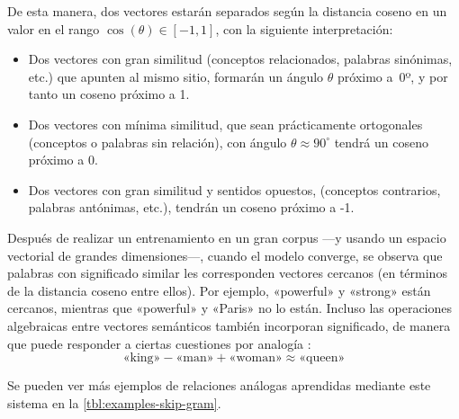De esta manera, dos vectores estarán separados según la distancia coseno en un valor en el rango $\cos(\theta) \in [-1,1]$, con la siguiente interpretación:
\begin{itemize}
\item Dos vectores con gran similitud (conceptos relacionados, palabras sinónimas, etc.) que apunten al mismo sitio, formarán un ángulo $\theta$ próximo a~0º, y por tanto un coseno próximo a 1.
\item Dos vectores con mínima similitud, que sean prácticamente ortogonales (conceptos o palabras sin relación), con ángulo $\theta \approx 90^{\circ}$ tendrá un coseno próximo a 0.
\item Dos vectores con gran similitud y sentidos opuestos, (conceptos contrarios, palabras antónimas, etc.), tendrán un coseno próximo a -1.
\end{itemize}

Después de realizar un entrenamiento en un gran corpus ---y usando un espacio vectorial de grandes dimensiones---, cuando el modelo converge, se observa que palabras con significado similar les corresponden vectores cercanos (en términos de la distancia coseno entre ellos). Por ejemplo, «powerful» y «strong» están cercanos, mientras que «powerful» y «Paris» no lo están. Incluso las operaciones algebraicas entre vectores semánticos también incorporan significado, de manera que puede responder a ciertas cuestiones por analogía \citep{DBLP:journals/corr/LeM14}:
\[
\text{«king»} - \text{«man»} + \text{«woman»} \approx \text{«queen»}
\]

Se pueden ver más ejemplos de relaciones análogas aprendidas mediante este sistema en la \autoref{tbl:examples-skip-gram}.

